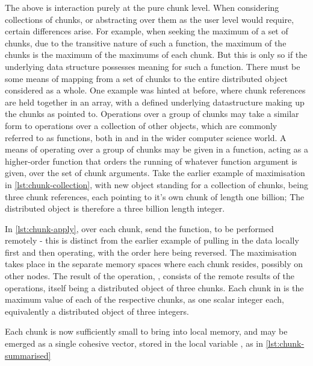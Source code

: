 The above is interaction purely at the pure chunk level. When
considering collections of chunks, or abstracting over them as the user
level would require, certain differences arise. For example, when
seeking the maximum of a set of chunks, due to the transitive nature of
such a function, the maximum of the chunks is the maximum of the
maximums of each chunk. But this is only so if the underlying data
structure possesses meaning for such a function. There must be some
means of mapping from a set of chunks to the entire distributed object
considered as a whole. One example was hinted at before, where chunk
references are held together in an array, with a defined underlying
datastructure making up the chunks as pointed to. Operations over a
group of chunks may take a similar form to operations over a collection
of other objects, which are commonly referred to as 
functions, both in \R{} and in the wider computer science world. A means of
operating over a group of chunks may be given in a 
function, acting as a higher-order function that orders the running of
whatever function argument is given, over the set of chunk arguments.
Take the earlier example of maximisation in \cref{lst:chunk-collection}, with new object 
standing for a collection of chunks, being three chunk references, each
pointing to it's own chunk of length one billion; The distributed object
is therefore a three billion length integer.


In \cref{lst:chunk-apply}, over each chunk, send the  function, to be performed
remotely - this is distinct from the earlier example of pulling in the
data locally first and then operating, with the order here being
reversed. The maximisation takes place in the separate memory spaces
where each chunk resides, possibly on other nodes. The result of the
operation, , consists of the remote results of the
operations, itself being a distributed object of three chunks. Each
chunk in  is the maximum value of each of the respective
 chunks, as one scalar integer each, equivalently a
distributed object of three integers.


Each chunk is now sufficiently small to bring into local memory, and may
be emerged as a single cohesive vector, stored in the local variable
, as in \cref{lst:chunk-summarised}

